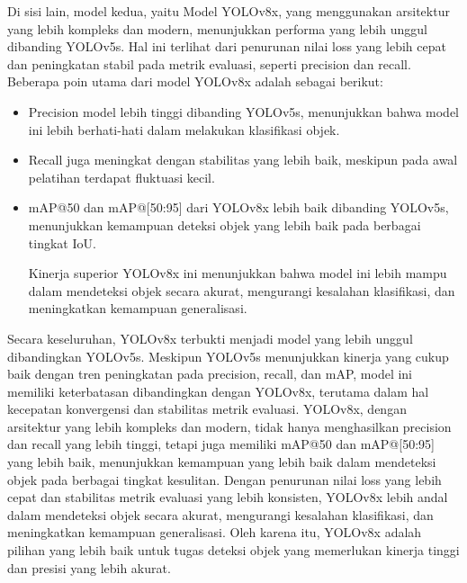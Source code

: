 \documentclass[12pt,a4paper]{article}
\begin{document}
\begin{adjustwidth}{3em}{0pt}
\hspace{0.5cm} Di sisi lain, model kedua, yaitu Model YOLOv8x, yang menggunakan arsitektur yang lebih kompleks dan modern, menunjukkan performa yang lebih unggul dibanding YOLOv5s. Hal ini terlihat dari penurunan nilai loss yang lebih cepat dan peningkatan stabil pada metrik evaluasi, seperti precision dan recall. Beberapa poin utama dari model YOLOv8x adalah sebagai berikut:
\begin{itemize}
    \item Precision model lebih tinggi dibanding YOLOv5s, menunjukkan bahwa model ini lebih berhati-hati dalam melakukan klasifikasi objek.
    \item Recall juga meningkat dengan stabilitas yang lebih baik, meskipun pada awal pelatihan terdapat fluktuasi kecil.
    \item mAP@50 dan mAP@[50:95] dari YOLOv8x lebih baik dibanding YOLOv5s, menunjukkan kemampuan deteksi objek yang lebih baik pada berbagai tingkat IoU.

Kinerja superior YOLOv8x ini menunjukkan bahwa model ini lebih mampu dalam mendeteksi objek secara akurat, mengurangi kesalahan klasifikasi, dan meningkatkan kemampuan generalisasi.
\end{itemize}
Secara keseluruhan, YOLOv8x terbukti menjadi model yang lebih unggul dibandingkan YOLOv5s. Meskipun YOLOv5s menunjukkan kinerja yang cukup baik dengan tren peningkatan pada precision, recall, dan mAP, model ini memiliki keterbatasan dibandingkan dengan YOLOv8x, terutama dalam hal kecepatan konvergensi dan stabilitas metrik evaluasi. YOLOv8x, dengan arsitektur yang lebih kompleks dan modern, tidak hanya menghasilkan precision dan recall yang lebih tinggi, tetapi juga memiliki mAP@50 dan mAP@[50:95] yang lebih baik, menunjukkan kemampuan yang lebih baik dalam mendeteksi objek pada berbagai tingkat kesulitan. Dengan penurunan nilai loss yang lebih cepat dan stabilitas metrik evaluasi yang lebih konsisten, YOLOv8x lebih andal dalam mendeteksi objek secara akurat, mengurangi kesalahan klasifikasi, dan meningkatkan kemampuan generalisasi. Oleh karena itu, YOLOv8x adalah pilihan yang lebih baik untuk tugas deteksi objek yang memerlukan kinerja tinggi dan presisi yang lebih akurat.
\end{adjustwidth}
\end{document}
